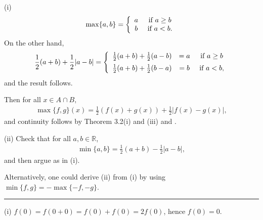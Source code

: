 \documentclass[letterpaper,10pt,english]{jupyterBook}
\begin{document}
\sphinxAtStartPar
{\hyperref[\detokenize{Problems:id20}]{}} 
(i)
\begin{equation*}
\begin{split}
\max\{a, b\} = \left\{\begin{array}{c c} a & ~\mbox{if}~a \geq b\\
b & ~\mbox{if}~a < b.\\ \end{array} \right.
\end{split}
\end{equation*}
\sphinxAtStartPar
On the other hand,
\begin{equation*}
\begin{split}
\frac{1}{2}( a+b) + \frac{1}{2}|a-b| = \left\{\begin{array}{c c c} \frac{1}{2}(a+b) + \frac{1}{2}(a- b) & = a & ~\mbox{if}~a \geq b\\[.5em]
\frac{1}{2}(a+b) + \frac{1}{2}(b- a) &=  b & ~\mbox{if}~a < b,\\ \end{array} \right.
\end{split}
\end{equation*}
\sphinxAtStartPar
and the result follows.

\sphinxAtStartPar
Then for all \(x \in A\cap B,\)
\begin{equation*}
\begin{split}
\max\{f, g\}(x) = \frac{1}{2}(f(x) + g(x)) + \frac{1}{2}|f(x) - g(x)|,
\end{split}
\end{equation*}
\sphinxAtStartPar
and continuity follows by Theorem  3.2(i) and (iii) and {\hyperref[\detokenize{Problems:id14}]{}}.

\sphinxAtStartPar
(ii) Check that for all \(a, b \in \mathbb{R}\),
\begin{equation*}
\begin{split}
\min\{a, b\} = \frac{1}{2}(a + b) - \frac{1}{2}|a - b|,
\end{split}
\end{equation*}
\sphinxAtStartPar
and then argue as in (i).

\sphinxAtStartPar
Alternatively, one could derive (ii) from (i) by using \(\min\{f,g\} = - \max\{-f, -g\}\).


\bigskip\hrule\bigskip


\sphinxAtStartPar
{\hyperref[\detokenize{Problems:id21}]{}}
(i) \(f(0) = f(0 + 0) = f(0) + f(0) = 2f(0)\), hence \(f(0) = 0\).
\end{document}
